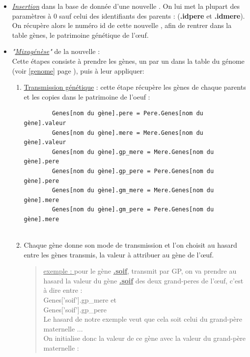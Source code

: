 \documentclass[french]{report}
\begin{document}
\begin{itemize}
	\item \textit{\underline{Insertion}} dans la base de donnée  d'une nouvelle \CoCiX. On lui met la plupart des paramètres à 0 sauf celui des identifiants des parents : (\textbf{.idpere} et \textbf{.idmere}). On récupère alors le numéro id de cette nouvelle \CoCiX, afin de rentrer dans la table gènes, le patrimoine génétique de l’œuf.\\
	
	\item \textit{"\underline{Mixagénèse}"} de la nouvelle \CoCiX : \\
	Cette étapes consiste à prendre les gènes, un par un dans la table du génome (voir \ref{genome} page \pageref{genome}), puis à leur appliquer: \\ 
	
	\begin{enumerate}
		
		\item \underline{Transmission génétique} : cette étape récupère les gènes de chaque parents et les copies dans le patrimoine de l'oeuf : \\
		\begin{verbatim}
		Genes[nom du gène].pere = Pere.Genes[nom du gène].valeur
		Genes[nom du gène].mere = Mere.Genes[nom du gène].valeur
		Genes[nom du gène].gp_mere = Mere.Genes[nom du gène].pere
		Genes[nom du gène].gp_pere = Pere.Genes[nom du gène].pere
		Genes[nom du gène].gm_mere = Mere.Genes[nom du gène].mere
		Genes[nom du gène].gm_pere = Pere.Genes[nom du gène].mere
		
		\end{verbatim}
		
		\item Chaque gène donne son mode de transmission et l'on choisit au hasard entre les gènes transmis, la valeur à attribuer au gène de l’œuf.\\
		
		\begin{quote}
			\underline{exemple : }
			pour le gène \underline{\textbf{.soif}}, transmit par GP, on va prendre au hasard la valeur du gène \underline{\textbf{.soif}} des deux grand-peres de l’œuf, c'est à dire entre : \\
			Genes['soif'].gp\_mere et\\
			Genes['soif'].gp\_pere\\
			
			Le hasard de notre exemple veut que cela soit celui du grand-père maternelle ...\\
			On initialise donc la valeur de ce gène avec la valeur du grand-père maternelle : \\
			

\end{quote}
\end{enumerate}
\end{itemize}
\end{document}
